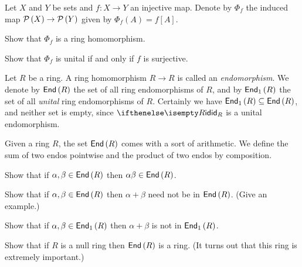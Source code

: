 \begin{exercise}
Let \(X\) and \(Y\) be sets and \(f : X \rightarrow Y\) an injective map.
Denote by \(\Phi_f\) the induced map \(\mathcal{P}\left(X\right) \rightarrow \mathcal{P}\left(Y\right)\) given by \(\Phi_f(A) = f[A]\).
\begin{proplist}
\item Show that \(\Phi_f\) is a ring homomorphism.
\item Show that \(\Phi_f\) is unital if and only if \(f\) is surjective.
\end{proplist}
\end{exercise}


\begin{dfn}[Endomorphism] \label{dfn:endo}
Let \(R\) be a ring.
A ring homomorphism \(R \rightarrow R\) is called an \emph{endomorphism}.
We denote by \( \mathsf{End}\left(R\right) \) the set of all ring endomorphisms of \(R\), and by \( \mathsf{End}_1\left(R\right) \) the set of all \emph{unital} ring endomorphisms of \(R\).
Certainly we have \( \mathsf{End}_1\left(R\right)  \subseteq  \mathsf{End}\left(R\right) \), and neither set is empty, since \(\ID[R]\) is a unital endomorphism.
\end{dfn}


\begin{exercise}
Given a ring \(R\), the set \( \mathsf{End}\left(R\right) \) comes with a sort of arithmetic.
We define the sum of two endos pointwise and the product of two endos by composition.
\begin{proplist}
\item Show that if \(\alpha, \beta \in  \mathsf{End}\left(R\right) \) then \(\alpha\beta \in  \mathsf{End}\left(R\right) \).
\item Show that if \(\alpha, \beta \in  \mathsf{End}\left(R\right) \) then \(\alpha + \beta\) need not be in \( \mathsf{End}\left(R\right) \).
(Give an example.)
\item Show that if \(\alpha, \beta \in  \mathsf{End}_1\left(R\right) \) then \(\alpha + \beta\) is not in \( \mathsf{End}_1\left(R\right) \).
\end{proplist}
\end{exercise}


\begin{exercise}
Show that if \(R\) is a null ring then \( \mathsf{End}\left(R\right) \) is a ring.
(It turns out that this ring is extremely important.)
\end{exercise}
